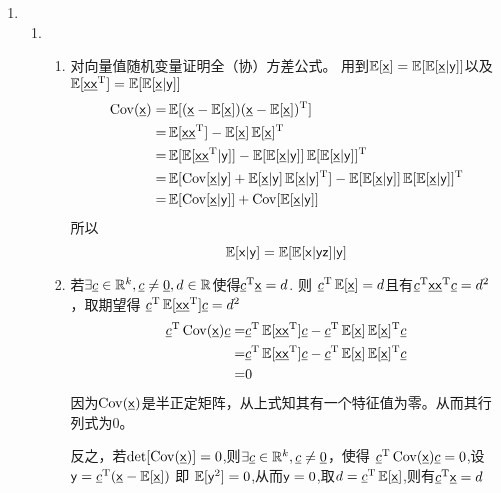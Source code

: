 \documentclass[a4paper]{article}
\begin{document}
\begin{enumerate}[label=\thehwcnt.\arabic*.]
  \setlength{\itemsep}{3\parskip}

  \item 
    \begin{enumerate}[label=(\alph*)]
    \item 
    \begin{enumerate}[label=\roman*.]
      \item 
         对向量值随机变量证明全（协）方差公式。
         用到$\E[\urvx]=\E[\E[\urvx|\rvy]]$以及
         $\E[\urvx\urvx^\TT]=\E[\E[\urvx|\rvy]]$
        \begin{align*}
        \Cov(\urvx) = & \E[(\urvx-\E[\urvx])(\urvx-\E[\urvx])^\TT] \\    
                    = & \E[\urvx\urvx^\TT]-\E[\urvx]\E[\urvx]^\TT\\
                    = & \E[\E[\urvx\urvx^\TT|\rvy]]-\E[\E[\urvx|\rvy]]\E[\E[\urvx|\rvy]]^\TT\\
                    = & \E[\Cov[\urvx|\rvy]+\E[\urvx|\rvy]\E[\urvx|\rvy]^\TT]-\E[\E[\urvx|\rvy]]\E[\E[\urvx|\rvy]]^\TT\\
                    = & \E[\Cov[\urvx|\rvy]]+\Cov[\E[\urvx|\rvy]]\\       
        \end{align*}
        所以
        \begin{equation}
        \E[\rvx|\rvy]=\E[\E[\rvx|\rvy \rvz]|\rvy]
        \end{equation}

      \item 
        若$\exists \v{c}\in \mathbb{R}^k,\v{c}\neq \v{0},d\in \mathbb{R}$使得$\v{c}^\TT \urvx =d$.
        则 $\v{c}^\TT \E[\urvx] =d$且有$\v{c}^\TT \urvx \urvx^\TT \v{c} =d^2$，取期望得
        $\v{c}^\TT \E[\urvx \urvx^\TT] \v{c} =d^2$
        \begin{align*}
        \v{c}^\TT \Cov(\urvx)\v{c} = & \v{c}^\TT\E[\urvx\urvx^\TT]\v{c}-\v{c}^\TT\E[\urvx]\E[\urvx]^\TT\v{c}\\
        = & \v{c}^\TT\E[\urvx\urvx^\TT]\v{c}-\v{c}^\TT\E[\urvx]\E[\urvx]^\TT\v{c}\\
        = & 0
        \end{align*}
        因为$\Cov(\urvx)$是半正定矩阵，从上式知其有一个特征值为零。从而其行列式为0。
        
        反之，若$\det[\Cov(\urvx)]=0$,则$\exists \v{c}\in \mathbb{R}^k,\v{c}\neq \v{0}$，使得
        $\v{c}^\TT \Cov(\urvx)\v{c}=0$,设$\rvy=\v{c}^\TT(\urvx-\E[\urvx])$
        即 $\E[\rvy^2]=0$,从而$\rvy=0$,取$d=\v{c}^\TT\E[\urvx]$,则有$\v{c}^\TT\urvx=d$
      

\end{enumerate}
\end{enumerate}
\end{enumerate}
\end{document}
